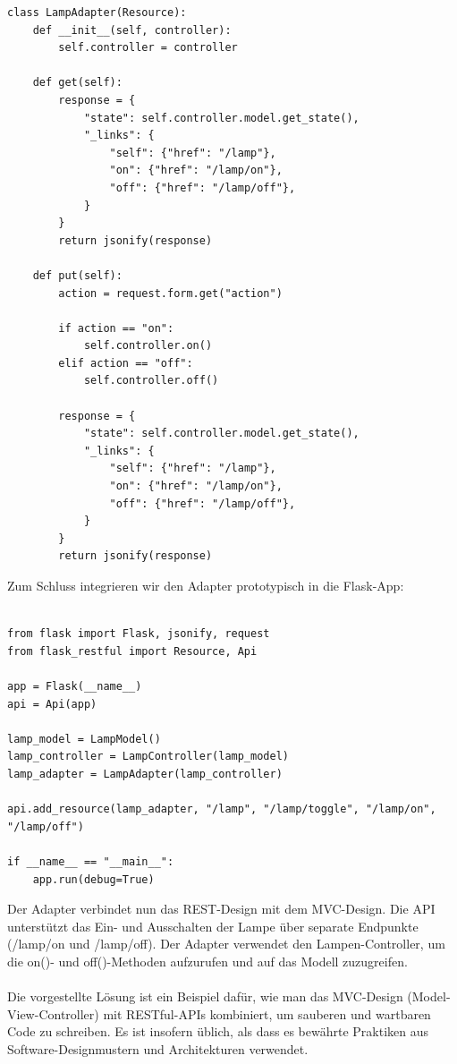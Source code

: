\begin{lstlisting}[caption={LampAdapter},captionpos=b,label={lst:lamp_a}]
class LampAdapter(Resource):
    def __init__(self, controller):
        self.controller = controller

    def get(self):
        response = {
            "state": self.controller.model.get_state(),
            "_links": {
                "self": {"href": "/lamp"},
                "on": {"href": "/lamp/on"},
                "off": {"href": "/lamp/off"},
            }
        }
        return jsonify(response)

    def put(self):
        action = request.form.get("action")

        if action == "on":
            self.controller.on()
        elif action == "off":
            self.controller.off()

        response = {
            "state": self.controller.model.get_state(),
            "_links": {
                "self": {"href": "/lamp"},
                "on": {"href": "/lamp/on"},
                "off": {"href": "/lamp/off"},
            }
        }
        return jsonify(response)
\end{lstlisting}
Zum Schluss integrieren wir den Adapter prototypisch in die Flask-App:\\\\
\begin{lstlisting}[caption={Lamp REST APP},captionpos=b,label={lst:lamp_r}]
from flask import Flask, jsonify, request
from flask_restful import Resource, Api

app = Flask(__name__)
api = Api(app)

lamp_model = LampModel()
lamp_controller = LampController(lamp_model)
lamp_adapter = LampAdapter(lamp_controller)

api.add_resource(lamp_adapter, "/lamp", "/lamp/toggle", "/lamp/on", "/lamp/off")

if __name__ == "__main__":
    app.run(debug=True)
\end{lstlisting}
Der Adapter verbindet nun das REST-Design mit dem MVC-Design. Die API unterstützt das Ein- und Ausschalten der Lampe über separate Endpunkte (/lamp/on und /lamp/off). Der Adapter verwendet den Lampen-Controller, um die on()- und off()-Methoden aufzurufen und auf das Modell zuzugreifen.
\\\\
Die vorgestellte Lösung ist ein Beispiel dafür, wie man das MVC-Design (Model-View-Controller) mit RESTful-APIs kombiniert, um sauberen und wartbaren Code zu schreiben. Es ist insofern üblich, als dass es bewährte Praktiken aus Software-Designmustern und Architekturen verwendet.

